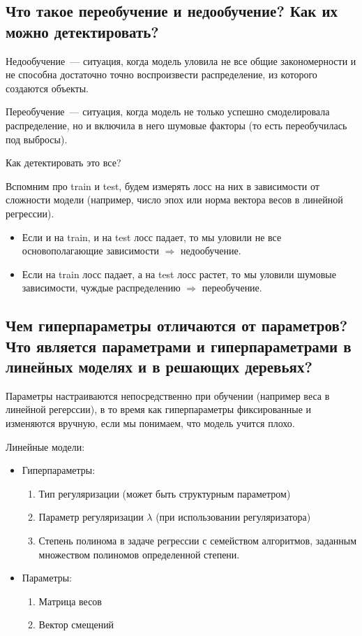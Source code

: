 \subsection{Что такое переобучение и недообучение? Как их можно детектировать?}

\Def Недообучение~--- ситуация, когда модель уловила не все общие закономерности и не способна достаточно точно воспроизвести распределение, из которого создаются объекты.

\Def Переобучение~--- ситуация, когда модель не только успешно смоделировала распределение, но и включила в него шумовые факторы (то есть переобучилась под выбросы).

Как детектировать это все?

Вспомним про train и test, будем измерять лосс на них в зависимости от сложности модели (например, число эпох или норма вектора весов в линейной регрессии).
\begin{itemize}
    \item Если и на train, и на test лосс падает, то мы уловили не все основополагающие зависимости $\Longrightarrow$ недообучение.
    \item Если на train лосс падает, а на test лосс растет, то мы уловили шумовые зависимости, чуждые распределению $\Longrightarrow$ переобучение.
\end{itemize}










\subsection{Чем гиперпараметры отличаются от параметров? Что является параметрами и гиперпараметрами в линейных моделях и в решающих деревьях?}

Параметры настраиваются непосредственно при обучении (например веса в линейной регерссии), в то время как гиперпараметры фиксированные и изменяются вручную, если мы понимаем, что модель учится плохо.

Линейные модели:

\begin{itemize}
    \item Гиперпараметры:
    \begin{enumerate}
        \item Тип регуляризации (может быть структурным параметром)
        \item Параметр регуляризации $\lambda$ (при использовании регуляризатора)
        \item Степень полинома в задаче регрессии с семейством алгоритмов, заданным множеством полиномов определенной степени.
    \end{enumerate}
    
    \item Параметры:
    
    \begin{enumerate}
        \item Матрица весов
        \item Вектор смещений
    \end{enumerate}
\end{itemize}

